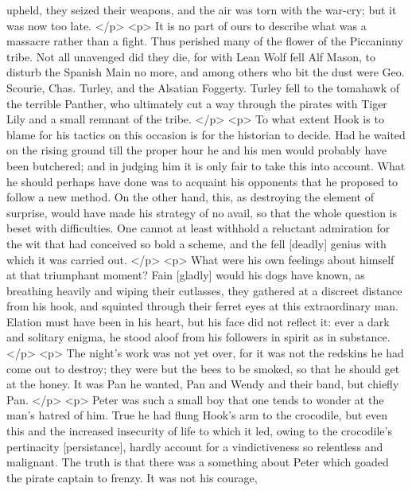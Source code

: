       upheld, they seized their weapons, and the air was torn with the war-cry;
      but it was now too late.
    </p>
    <p>
      It is no part of ours to describe what was a massacre rather than a fight.
      Thus perished many of the flower of the Piccaninny tribe. Not all
      unavenged did they die, for with Lean Wolf fell Alf Mason, to disturb the
      Spanish Main no more, and among others who bit the dust were Geo. Scourie,
      Chas. Turley, and the Alsatian Foggerty. Turley fell to the tomahawk of
      the terrible Panther, who ultimately cut a way through the pirates with
      Tiger Lily and a small remnant of the tribe.
    </p>
    <p>
      To what extent Hook is to blame for his tactics on this occasion is for
      the historian to decide. Had he waited on the rising ground till the
      proper hour he and his men would probably have been butchered; and in
      judging him it is only fair to take this into account. What he should
      perhaps have done was to acquaint his opponents that he proposed to follow
      a new method. On the other hand, this, as destroying the element of
      surprise, would have made his strategy of no avail, so that the whole
      question is beset with difficulties. One cannot at least withhold a
      reluctant admiration for the wit that had conceived so bold a scheme, and
      the fell [deadly] genius with which it was carried out.
    </p>
    <p>
      What were his own feelings about himself at that triumphant moment? Fain
      [gladly] would his dogs have known, as breathing heavily and wiping their
      cutlasses, they gathered at a discreet distance from his hook, and
      squinted through their ferret eyes at this extraordinary man. Elation must
      have been in his heart, but his face did not reflect it: ever a dark and
      solitary enigma, he stood aloof from his followers in spirit as in
      substance.
    </p>
    <p>
      The night's work was not yet over, for it was not the redskins he had come
      out to destroy; they were but the bees to be smoked, so that he should get
      at the honey. It was Pan he wanted, Pan and Wendy and their band, but
      chiefly Pan.
    </p>
    <p>
      Peter was such a small boy that one tends to wonder at the man's hatred of
      him. True he had flung Hook's arm to the crocodile, but even this and the
      increased insecurity of life to which it led, owing to the crocodile's
      pertinacity [persistance], hardly account for a vindictiveness so
      relentless and malignant. The truth is that there was a something about
      Peter which goaded the pirate captain to frenzy. It was not his courage,
